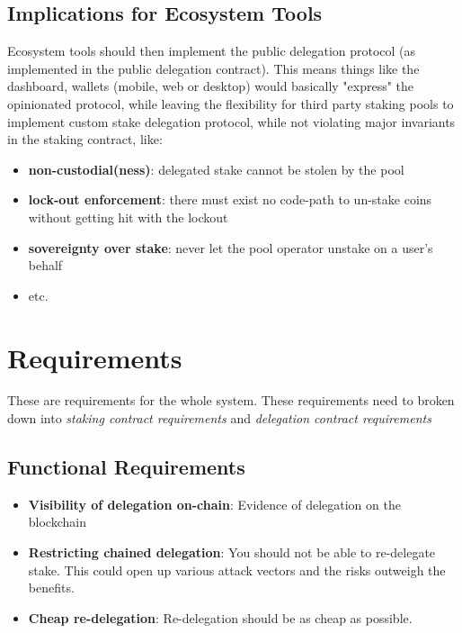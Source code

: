   




\subsection{Implications for Ecosystem Tools}
Ecosystem tools should then implement the public delegation protocol (as implemented in the public delegation contract). This means things like the dashboard, wallets (mobile, web or desktop) would basically "express" the opinionated protocol, while leaving the flexibility for third party staking pools to implement custom stake delegation protocol, while not violating major invariants in the staking contract, like: 
\begin{itemize}
    \item \textbf{non-custodial(ness)}: delegated stake cannot be stolen by the pool
    \item \textbf{lock-out enforcement}: there must exist no code-path to un-stake coins without getting hit with the lockout
    \item \textbf{sovereignty over stake}: never let the pool operator unstake on a user's behalf
    \item etc. 
\end{itemize}

\section{Requirements}
These are requirements for the whole system. These requirements need to broken down into \textit{staking contract requirements} and \textit{delegation contract requirements}
\subsection{Functional Requirements}
\begin{itemize}
    \item \textbf{Visibility of delegation on-chain}: Evidence of delegation on the blockchain
    \item \textbf{Restricting chained delegation}: You should not be able to re-delegate stake. This could open up various attack vectors and the risks outweigh the benefits.
    \item \textbf{Cheap re-delegation}: Re-delegation should be as cheap as possible. 
\end{itemize}

